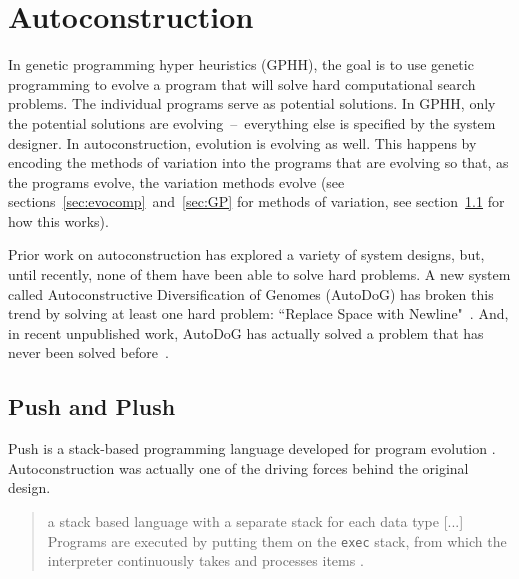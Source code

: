 \documentclass{sig-alternate}
\begin{document}
\section{Autoconstruction}
\label{sec:ac}
In genetic programming hyper heuristics (GPHH), the goal is to use genetic programming to evolve a program that will solve hard computational search problems. The individual programs serve as potential solutions. In GPHH, only the potential solutions are evolving~--~everything else is specified by the system designer.  In autoconstruction, evolution is evolving as well. This happens by encoding the methods of variation into the programs that are evolving so that, as the programs evolve, the variation methods evolve (see sections~\ref{sec:evocomp}~and~\ref{sec:GP} for methods of variation, see section~\ref{sec:push} for how this works).

Prior work on autoconstruction has explored a variety of system designs, but, until recently, none of them have been able to solve hard problems. A new system called Autoconstructive Diversification of Genomes (AutoDoG) has broken this trend by solving at least one hard problem: ``Replace Space with Newline"~\cite{spector:2016}. And, in recent unpublished work, AutoDoG has actually solved a problem that has never been solved before~\cite{Eva:autoconstruction}.

\subsection{Push and Plush}
\label{sec:push}

Push is a stack-based programming language developed for program evolution \cite{spector:2016}. Autoconstruction was actually one of the driving forces behind the original design. 

\begin{quotation}
	a stack based language with a separate stack for each data type [...] Programs are executed by putting them on the \texttt{exec} stack, from which the interpreter continuously takes and processes items \cite{spector:2016}.
\end{quotation}

\end{document}
